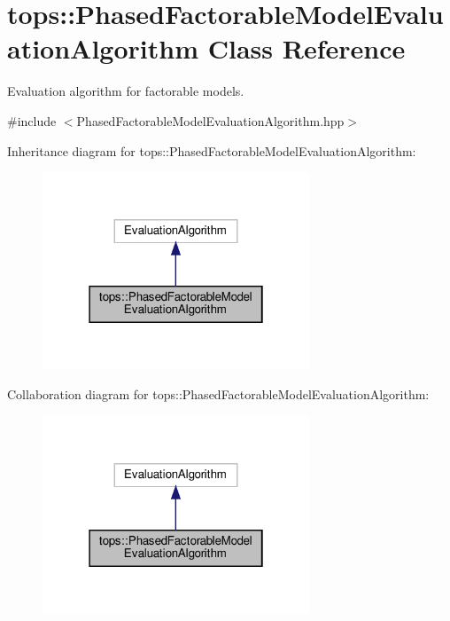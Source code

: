 \hypertarget{classtops_1_1PhasedFactorableModelEvaluationAlgorithm}{}\section{tops\+:\+:Phased\+Factorable\+Model\+Evaluation\+Algorithm Class Reference}
\label{classtops_1_1PhasedFactorableModelEvaluationAlgorithm}


Evaluation algorithm for factorable models.  




{\ttfamily \#include $<$Phased\+Factorable\+Model\+Evaluation\+Algorithm.\+hpp$>$}



Inheritance diagram for tops\+:\+:Phased\+Factorable\+Model\+Evaluation\+Algorithm\+:
\nopagebreak
\begin{figure}[H]
\begin{center}
\leavevmode
\includegraphics[width=226pt]{classtops_1_1PhasedFactorableModelEvaluationAlgorithm__inherit__graph}
\end{center}
\end{figure}


Collaboration diagram for tops\+:\+:Phased\+Factorable\+Model\+Evaluation\+Algorithm\+:
\nopagebreak
\begin{figure}[H]
\begin{center}
\leavevmode
\includegraphics[width=226pt]{classtops_1_1PhasedFactorableModelEvaluationAlgorithm__coll__graph}
\end{center}
\end{figure}
